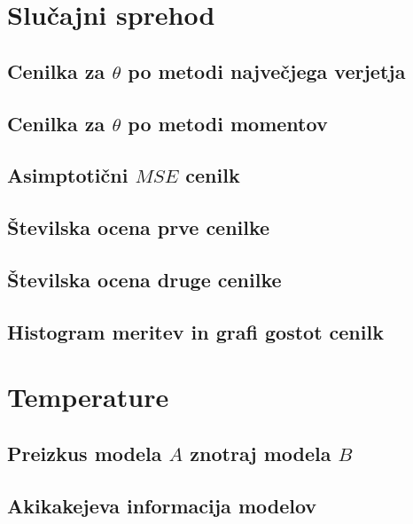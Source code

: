 \documentclass[a4paper, 10pt]{article}
\begin{document}
	\section{Slučajni sprehod} \label{sect: SlucajniSprehod}
	
	\subsection{Cenilka za $\theta$ po metodi največjega verjetja} \label{subsect: 2A}
	
	\subsection{Cenilka za $\theta$ po metodi momentov}\label{subsect: 2B}
	
	\subsection{Asimptotični $MSE$ cenilk}\label{subsect: 2C}
	
	\subsection{Številska ocena prve cenilke} \label{subsect: 2D}
	
	\subsection{Številska ocena druge cenilke} \label{subsect: 2E}
	
	\subsection{Histogram meritev in grafi gostot cenilk} \label{subsect: 2F}
	
	\section{Temperature}\label{sect: Temperature}
	
	\subsection{Preizkus modela $A$ znotraj modela $B$}\label{susect: 3A}
	
	\subsection{Akikakejeva informacija modelov}\label{subsect: 3B}
	
	
\end{document}
